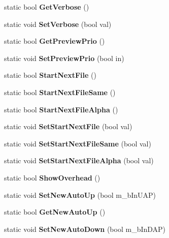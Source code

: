 \begin{DoxyCompactItemize}
\item 
static bool {\bfseries GetVerbose} ()\label{classCPreferences_a2cd9048f7e6d7a63c2a61da9503fa22c}

\item 
static void {\bfseries SetVerbose} (bool val)\label{classCPreferences_a9e4a1a039561832d9028ec1c0195beda}

\item 
static bool {\bfseries GetPreviewPrio} ()\label{classCPreferences_a4f1d30be3267e7c33d16453a1f2d58cc}

\item 
static void {\bfseries SetPreviewPrio} (bool in)\label{classCPreferences_af103be3ce45cbf736b7dd9dbde73f6b1}

\item 
static bool {\bfseries StartNextFile} ()\label{classCPreferences_a931f589d256eed3131d08ad0fb5c4280}

\item 
static bool {\bfseries StartNextFileSame} ()\label{classCPreferences_abe907c142908d40066c6c651cc3318cd}

\item 
static bool {\bfseries StartNextFileAlpha} ()\label{classCPreferences_a605c646f46819c364f04a729d03479d7}

\item 
static void {\bfseries SetStartNextFile} (bool val)\label{classCPreferences_ace9a75115a565912db4740c0322f7b9d}

\item 
static void {\bfseries SetStartNextFileSame} (bool val)\label{classCPreferences_ad0df7a199c6f1ce71e92d0368fe349f8}

\item 
static void {\bfseries SetStartNextFileAlpha} (bool val)\label{classCPreferences_a7942aba4fd44a50eb8e32aa0d108b071}

\item 
static bool {\bfseries ShowOverhead} ()\label{classCPreferences_aa2ff92baaab0a7996ac7a1347773d930}

\item 
static void {\bfseries SetNewAutoUp} (bool m\_\-bInUAP)\label{classCPreferences_aedcc5c513319e8affa76bbacbf74912a}

\item 
static bool {\bfseries GetNewAutoUp} ()\label{classCPreferences_a4ae1f3af2dd2cc0aa50b466a279c1095}

\item 
static void {\bfseries SetNewAutoDown} (bool m\_\-bInDAP)\label{classCPreferences_a900f0d233ab0b00fb91b9982f856339c}


\end{DoxyCompactItemize}
